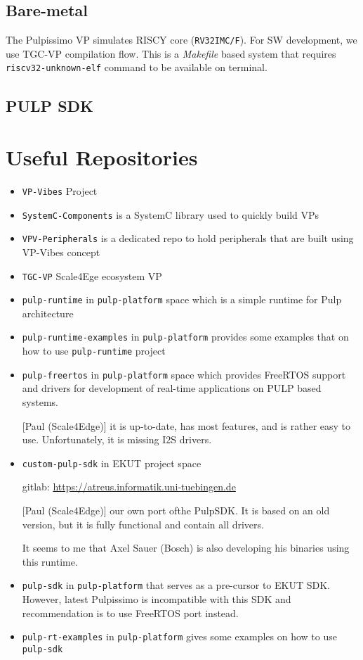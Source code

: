 \documentclass{article}
\begin{document}
\subsection{Bare-metal}
The Pulpissimo VP simulates RISCY core (\texttt{RV32IMC/F}). For SW development, we use
TGC-VP compilation flow. This is a \textit{Makefile} based system that requires \texttt{riscv32-unknown-elf}
command to be available on terminal.

\subsection{PULP SDK}

\newpage
\section{Useful Repositories}
\begin{itemize}
 \item \texttt{VP-Vibes} Project
 \item \texttt{SystemC-Components} is a SystemC library used to quickly build VPs
 \item \texttt{VPV-Peripherals} is a dedicated repo to hold peripherals that are built using VP-Vibes concept
 \item \texttt{TGC-VP} Scale4Ege ecosystem VP
 \item \texttt{pulp-runtime} in \texttt{pulp-platform} space which is a simple runtime for Pulp architecture
 \item \texttt{pulp-runtime-examples} in \texttt{pulp-platform} provides some examples that on how to use
       \texttt{pulp-runtime} project
 \item \texttt{pulp-freertos} in \texttt{pulp-platform} space which provides FreeRTOS support and drivers for
       development of real-time applications on PULP based systems.

        [Paul (Scale4Edge)] it is up-to-date, has most features, and is rather easy to use. Unfortunately, it is
       missing I2S drivers.
 \item \texttt{custom-pulp-sdk} in EKUT project space

       gitlab: \url{https://atreus.informatik.uni-tuebingen.de}

       [Paul (Scale4Edge)] our own port ofthe PulpSDK. It is based on an old version, but it is fully functional
       and contain all drivers.

       It seems to me that Axel Sauer (Bosch) is also developing his binaries using this runtime.
 \item \texttt{pulp-sdk} in \texttt{pulp-platform} that serves as a pre-cursor to EKUT SDK. However, latest
       Pulpissimo is incompatible with this SDK and recommendation is to use FreeRTOS port instead.
 \item \texttt{pulp-rt-examples} in \texttt{pulp-platform} gives some examples on how to use \texttt{pulp-sdk}
\end{itemize}
\end{document}

